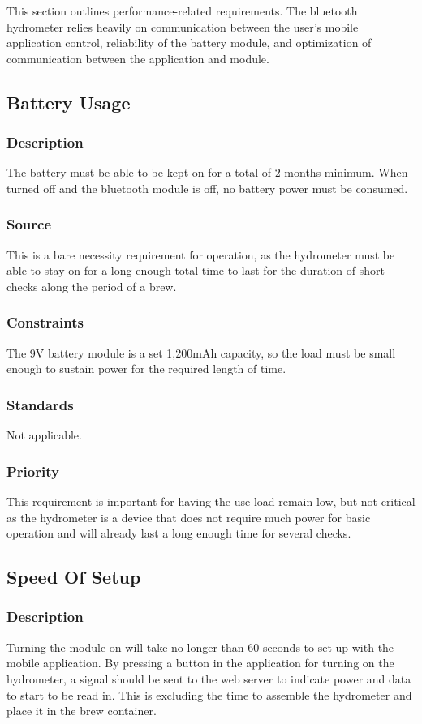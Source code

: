 This section outlines performance-related requirements. The bluetooth hydrometer relies heavily on communication between the user's mobile application control, reliability of the battery module, and optimization of communication between the application and module.

\subsection{Battery Usage}
\subsubsection{Description}
The battery must be able to be kept on for a total of 2 months minimum. When turned off and the bluetooth module is off, no battery power must be consumed.
\subsubsection{Source}
This is a bare necessity requirement for operation, as the hydrometer must be able to stay on for a long enough total time to last for the duration of short checks along the period of a brew.
\subsubsection{Constraints}
The 9V battery module is a set 1,200mAh capacity, so the load must be small enough to sustain power for the required length of time.
\subsubsection{Standards}
Not applicable.
\subsubsection{Priority}
This requirement is important for having the use load remain low, but not critical as the hydrometer is a device that does not require much power for basic operation and will already last a long enough time for several checks.
\subsection{Speed Of Setup}
\subsubsection{Description}
Turning the module on will take no longer than 60 seconds to set up with the mobile application. By pressing a button in the application for turning on the hydrometer, a signal should be sent to the web server to indicate power and data to start to be read in. This is excluding the time to assemble the hydrometer and place it in the brew container.
